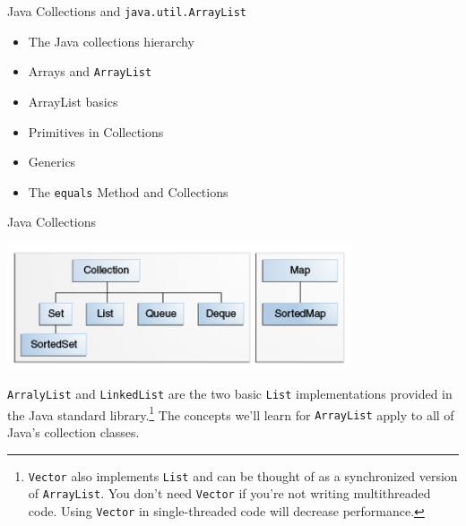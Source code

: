 \documentclass{beamer}
\begin{document}
\begin{frame}
  \titlepage
\end{frame}

\begin{frame}[fragile]{Java Collections and {\tt java.util.ArrayList}}

\begin{itemize}
\item The Java collections hierarchy
\item Arrays and {\tt ArrayList}
\item ArrayList basics
\item Primitives in Collections
\item Generics
\item The {\tt equals} Method and Collections
\end{itemize}


\end{frame}

\begin{frame}[fragile]{Java Collections}

\begin{center}
\includegraphics[width=4in]{colls-coreInterfaces.png}
\end{center}

{\tt ArralyList} and {\tt LinkedList} are the two basic {\tt List} implementations provided in the Java standard library.\footnote{{\tt Vector} also implements {\tt List} and can be thought of as a synchronized version of {\tt ArrayList}.  You don't need {\tt Vector} if you're not writing multithreaded code.  Using {\tt Vector} in single-threaded code will decrease performance.}  The concepts we'll learn for {\tt ArrayList} apply to all of Java's collection classes.

\end{frame}
\end{document}
